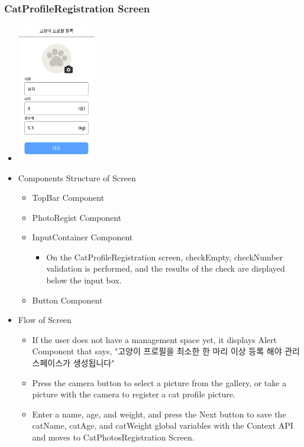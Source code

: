\documentclass[conference]{IEEEtran}
\begin{document}
\subsubsection{CatProfileRegistration Screen}
\begin{itemize}
    \item[] \includegraphics[width=0.27\textwidth]{img/D/11.png}
    \item Components Structure of Screen
    \begin{itemize}
        \item TopBar Component
        \item PhotoRegist Component
        \item InputContainer Component
        \begin{itemize}
            \item On the CatProfileRegistration screen, checkEmpty, checkNumber validation is performed, and the results of the check are displayed below the input box.
        \end{itemize}
        \item Button Component
    \end{itemize}
    \item Flow of Screen
    \begin{itemize}
        \item If the user does not have a management space yet, it displays Alert Component that says, "고양이 프로필을 최소한 한 마리 이상 등록 해야 관리 스페이스가 생성됩니다"
        \item Press the camera button to select a picture from the gallery, or take a picture with the camera to register a cat profile picture.
        \item Enter a name, age, and weight, and press the Next button to save the catName, catAge, and catWeight global variables with the Context API and moves to CatPhotosRegistration Screen.
    \end{itemize}
\end{itemize}
\newpage
\end{document}
